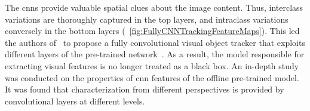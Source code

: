 The \glspl{cnn} provide valuable spatial clues about the image content. Thus, interclass variations are thoroughly captured in the top layers, and intraclass variations conversely in the bottom layers (\figtext{}~\ref{fig:FullyCNNTrackingFeatureMaps}). This led the authors of~\cite{wang2015votcnn} to propose a fully convolutional visual object tracker that exploits different layers of the pre-trained network~\cite{simonyan2015verydeepcnn}. As a result, the model responsible for extracting visual features is no longer treated as a black box. An in-depth study was conducted on the properties of \gls{cnn} features of the offline pre-trained model. It was found that characterization from different perspectives is provided by convolutional layers at different levels.


